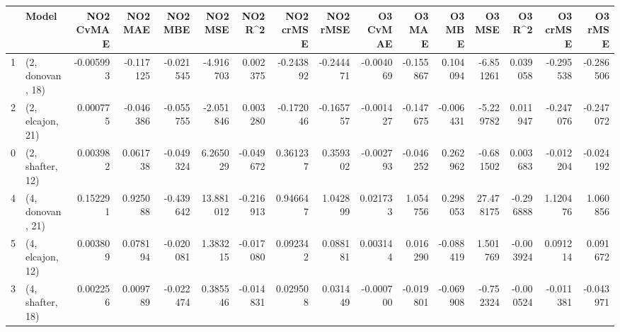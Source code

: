 \begin{tabular}{llrrrrrrrrrrrrrr}
\toprule
{} &             Model &  NO2 CvMAE &   NO2 MAE &   NO2 MBE &    NO2 MSE &   NO2 R\textasciicircum2 &  NO2 crMSE &  NO2 rMSE &  O3 CvMAE &    O3 MAE &    O3 MBE &     O3 MSE &    O3 R\textasciicircum2 &  O3 crMSE &   O3 rMSE \\
\midrule
1 &  (2, donovan, 18) &  -0.005993 & -0.117125 & -0.021545 &  -4.916703 &  0.002375 &  -0.243892 & -0.244471 & -0.004069 & -0.155867 &  0.104094 &  -6.851261 &  0.039058 & -0.295538 & -0.286506 \\
2 &  (2, elcajon, 21) &   0.000775 & -0.046386 & -0.055755 &  -2.051846 &  0.003280 &  -0.172046 & -0.165757 & -0.001427 & -0.147675 & -0.006431 &  -5.229782 &  0.011947 & -0.247076 & -0.247072 \\
0 &  (2, shafter, 12) &   0.003982 &  0.061738 & -0.049324 &   6.265029 & -0.049672 &   0.361237 &  0.359302 & -0.002793 & -0.046252 &  0.262962 &  -0.681502 &  0.003683 & -0.012204 & -0.024192 \\
4 &  (4, donovan, 21) &   0.152291 &  0.925088 & -0.439642 &  13.881012 & -0.216913 &   0.946647 &  1.042899 &  0.021733 &  1.054756 &  0.298053 &  27.478175 & -0.296888 &  1.120476 &  1.060856 \\
5 &  (4, elcajon, 12) &   0.003809 &  0.078194 & -0.020081 &   1.383215 & -0.017080 &   0.092342 &  0.088181 &  0.003144 &  0.016290 & -0.088419 &   1.501769 & -0.003924 &  0.091214 &  0.091672 \\
3 &  (4, shafter, 18) &   0.002256 &  0.009789 & -0.022474 &   0.385546 & -0.014831 &   0.029508 &  0.031449 & -0.000700 & -0.019801 & -0.069908 &  -0.752324 & -0.000524 & -0.011381 & -0.043971 \\
\bottomrule
\end{tabular}
